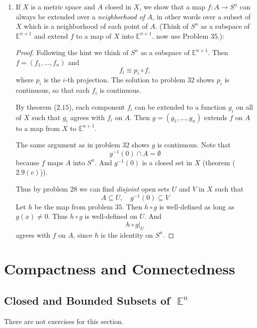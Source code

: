 \documentclass{book}
\DeclareMathOperator*{\E}{\mathbb{E}}
\begin{document}
\begin{enumerate}[(1)]
    \item  If $X$ is a metric space and $A$ closed in $X$, we show that a map $f:A\rightarrow S^n$ can always be extended over a {\it neighborhood of} $A$, in other words over a subset of $X$ which is a neighborhood of each point of $A$.  (Think of $S^n$ as a subspace of $\mathbb E^{n+1}$ and extend $f$ to a map of $X$ into $\mathbb E^{n+1}$.  now use Problem 35.):
        \begin{proof} Following the hint we think of $S^n$ as a subspace of $\mathbb E^{n+1}$.  Then $f=(f_1,\dots,f_n)$ and  \[f_i \equiv p_i\circ f,\]
            where $p_i$ is the $i$-th projection. The solution to problem $32$ shows $p_i$ is continuous, so that each $f_i$ is continuous.  
            \par By theorem ($2.15$), each component $f_i$ can be extended to a function $g_i$ on all of $X$ such that  $g_i$ agrees with $f_i$ on $A$.  Then $g=(g_1,\dots,g_n)$ extends $f$ on $A$ to a map from $X$ to $\mathbb E^{n+1}$.
            \par The same argument as in problem $32$ shows $g$ is continuous.   Note that 
            \[g^{-1}(0)\cap A=\emptyset\]
            because $f$ maps $A$ into $S^n$.  And $g^{-1}(0)$ is a closed set in $X$ (theorem ($2.9 (e)$)).  
            \par Thus by problem $28$ we can find {\it disjoint} open sets $U$ and $V$ in $X$ such that 
            \[A\subseteq U, \quad g^{-1}(0)\subseteq V\]  
            Let $h$ be the map from problem $35$.  Then $h\circ g$ is well-defined as long as $g(x)\neq0$.  Thus $h\circ g$ is well-defined on $U$.  And 
            \[h\circ g|_U\] agrees with $f$ on $A$, since $h$ is the identity on $S^n$.
        \end{proof}
\end{enumerate}


\newpage
\chapter{Compactness and Connectedness}

\section{Closed and Bounded Subsets of $\E^n$}
There are not exercises for this section. 
\end{document}
